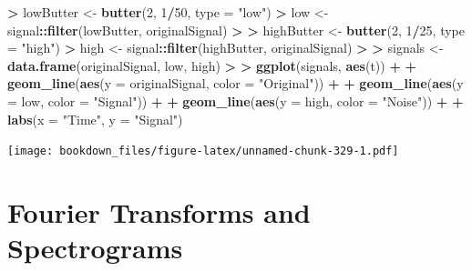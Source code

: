 \documentclass[]{krantz}
\makeatletter
\newenvironment{Shaded}{\begin{snugshade}}{\end{snugshade}}
\newcommand{\KeywordTok}[1]{\textcolor[rgb]{0.27,0.27,0.27}{\textbf{#1}}}
\newcommand{\DataTypeTok}[1]{\textcolor[rgb]{0.27,0.27,0.27}{#1}}
\newcommand{\DecValTok}[1]{\textcolor[rgb]{0.06,0.06,0.06}{#1}}
\newcommand{\StringTok}[1]{\textcolor[rgb]{0.5,0.5,0.5}{#1}}
\newcommand{\OperatorTok}[1]{\textcolor[rgb]{0.43,0.43,0.43}{\textbf{#1}}}
\newcommand{\ErrorTok}[1]{\textcolor[rgb]{0.14,0.14,0.14}{\textbf{#1}}}
\newcommand{\NormalTok}[1]{#1}
\newenvironment{kframe}{%
\medskip{}
\setlength{\fboxsep}{.8em}
 \def\at@end@of@kframe{}%
 \ifinner\ifhmode%
  \def\at@end@of@kframe{\end{minipage}}%
  \begin{minipage}{\columnwidth}%
 \fi\fi%
 \def\FrameCommand##1{\hskip\@totalleftmargin \hskip-\fboxsep
 \colorbox{shadecolor}{##1}\hskip-\fboxsep
     \hskip-\linewidth \hskip-\@totalleftmargin \hskip\columnwidth}%
 \MakeFramed {\advance\hsize-\width
   \@totalleftmargin\z@ \linewidth\hsize
   \@setminipage}}%
 {\par\unskip\endMakeFramed%
 \at@end@of@kframe}
\renewenvironment{Shaded}{\begin{kframe}}{\end{kframe}}
\makeatother
\begin{document}
\begin{Shaded}
\begin{Highlighting}[]
\OperatorTok{>}\StringTok{ }\NormalTok{lowButter <-}\StringTok{ }\KeywordTok{butter}\NormalTok{(}\DecValTok{2}\NormalTok{, }\DecValTok{1}\OperatorTok{/}\DecValTok{50}\NormalTok{, }\DataTypeTok{type =} \StringTok{"low"}\NormalTok{)}
\OperatorTok{>}\StringTok{ }\NormalTok{low <-}\StringTok{ }\NormalTok{signal}\OperatorTok{::}\KeywordTok{filter}\NormalTok{(lowButter, originalSignal)}
\OperatorTok{>}\StringTok{ }
\ErrorTok{>}\StringTok{ }\NormalTok{highButter <-}\StringTok{ }\KeywordTok{butter}\NormalTok{(}\DecValTok{2}\NormalTok{, }\DecValTok{1}\OperatorTok{/}\DecValTok{25}\NormalTok{, }\DataTypeTok{type =} \StringTok{"high"}\NormalTok{)}
\OperatorTok{>}\StringTok{ }\NormalTok{high <-}\StringTok{ }\NormalTok{signal}\OperatorTok{::}\KeywordTok{filter}\NormalTok{(highButter, originalSignal)}
\OperatorTok{>}\StringTok{ }
\ErrorTok{>}\StringTok{ }\NormalTok{signals <-}\StringTok{ }\KeywordTok{data.frame}\NormalTok{(originalSignal, low, high)}
\OperatorTok{>}\StringTok{ }
\ErrorTok{>}\StringTok{ }\KeywordTok{ggplot}\NormalTok{(signals, }\KeywordTok{aes}\NormalTok{(t)) }\OperatorTok{+}\StringTok{ }
\OperatorTok{+}\StringTok{   }\KeywordTok{geom_line}\NormalTok{(}\KeywordTok{aes}\NormalTok{(}\DataTypeTok{y =}\NormalTok{ originalSignal, }\DataTypeTok{color =} \StringTok{"Original"}\NormalTok{)) }\OperatorTok{+}\StringTok{ }
\OperatorTok{+}\StringTok{   }\KeywordTok{geom_line}\NormalTok{(}\KeywordTok{aes}\NormalTok{(}\DataTypeTok{y =}\NormalTok{ low, }\DataTypeTok{color =} \StringTok{"Signal"}\NormalTok{)) }\OperatorTok{+}\StringTok{ }
\OperatorTok{+}\StringTok{   }\KeywordTok{geom_line}\NormalTok{(}\KeywordTok{aes}\NormalTok{(}\DataTypeTok{y =}\NormalTok{ high, }\DataTypeTok{color =} \StringTok{"Noise"}\NormalTok{)) }\OperatorTok{+}\StringTok{ }
\OperatorTok{+}\StringTok{   }\KeywordTok{labs}\NormalTok{(}\DataTypeTok{x =} \StringTok{"Time"}\NormalTok{, }\DataTypeTok{y =} \StringTok{"Signal"}\NormalTok{)}
\end{Highlighting}
\end{Shaded}

\texttt{[image: bookdown\_files/figure-latex/unnamed-chunk-329-1.pdf]}

\section{Fourier Transforms and
Spectrograms}\label{fourier-transforms-and-spectrograms}
\end{document}
